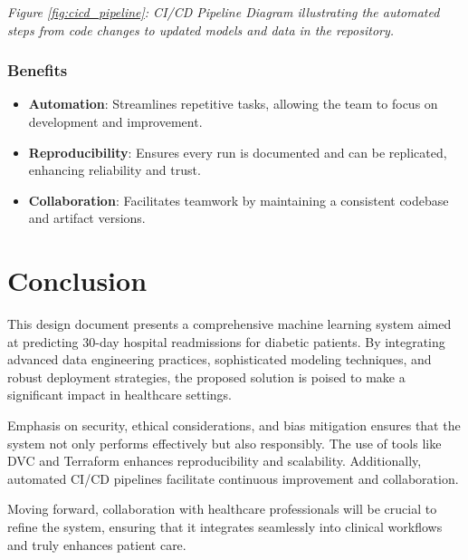 \documentclass{article}
\begin{document}
\textit{Figure \ref{fig:cicd_pipeline}: CI/CD Pipeline Diagram illustrating the automated steps from code changes to updated models and data in the repository.}

\subsubsection{Benefits}

\begin{itemize}[leftmargin=*]
    \item \textbf{Automation}: Streamlines repetitive tasks, allowing the team to focus on development and improvement.
    \item \textbf{Reproducibility}: Ensures every run is documented and can be replicated, enhancing reliability and trust.
    \item \textbf{Collaboration}: Facilitates teamwork by maintaining a consistent codebase and artifact versions.
\end{itemize}

\section{Conclusion}

This design document presents a comprehensive machine learning system aimed at predicting 30-day hospital readmissions for diabetic patients. By integrating advanced data engineering practices, sophisticated modeling techniques, and robust deployment strategies, the proposed solution is poised to make a significant impact in healthcare settings.

Emphasis on security, ethical considerations, and bias mitigation ensures that the system not only performs effectively but also responsibly. The use of tools like DVC and Terraform enhances reproducibility and scalability. Additionally, automated CI/CD pipelines facilitate continuous improvement and collaboration.

Moving forward, collaboration with healthcare professionals will be crucial to refine the system, ensuring that it integrates seamlessly into clinical workflows and truly enhances patient care.

\printbibliography
\end{document}
